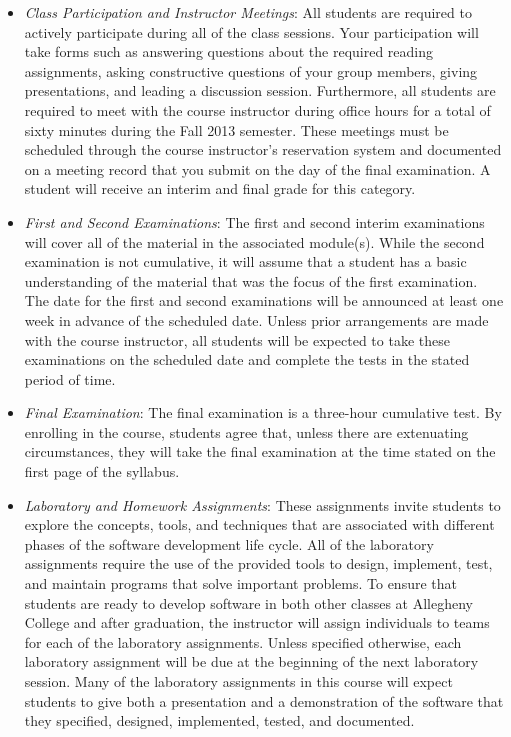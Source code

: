 \begin{itemize}

	\item {\em Class Participation and Instructor Meetings}: All students are required to actively participate during
		all of the class sessions. Your participation will take forms such as answering questions about the required
		reading assignments, asking constructive questions of your group members, giving presentations, and leading a
		discussion session. Furthermore, all students are required to meet with the course instructor during office
		hours for a total of sixty minutes during the Fall 2013 semester.  These meetings must be scheduled through the
		course instructor's reservation system and documented on a meeting record that you submit on the day of the final
		examination. A student will receive an interim and final grade for this category.

	\item {\em First and Second Examinations}: The first and second interim examinations will cover all of the material
		in the associated module(s).  While the second examination is not cumulative, it will assume that a student has a
		basic understanding of the material that was the focus of the first examination.  The date for the first and
		second examinations will be announced at least one week in advance of the scheduled date.  Unless prior
		arrangements are made with the course instructor, all students will be expected to take these examinations on the
		scheduled date and complete the tests in the stated period of time.

	\item {\em Final Examination}: The final examination is a three-hour cumulative test.  By enrolling in the course,
		students agree that, unless there are extenuating circumstances, they will take the final examination at the
		time stated on the first page of the syllabus.

	\item {\em Laboratory and Homework Assignments}: These assignments invite students to explore the concepts, tools,
		and techniques that are associated with different phases of the software development life cycle.  All of the
		laboratory assignments require the use of the provided tools to design, implement, test, and maintain programs
		that solve important problems.  To ensure that students are ready to develop software in both other classes at
		Allegheny College and after graduation, the instructor will assign individuals to teams for each of the
		laboratory assignments.  Unless specified otherwise, each laboratory assignment will be due at the beginning of
		the next laboratory session.  Many of the laboratory assignments in this course will expect students to
		give both a presentation and a demonstration of the software that they specified, designed, implemented, tested,
		and documented.  
	

\end{itemize}
